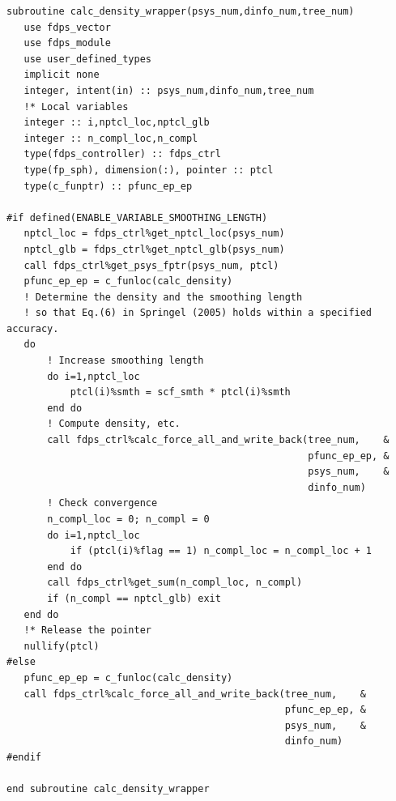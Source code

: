 \begin{lstlisting}[caption=Subroutine \texttt{calc\_density\_wrapper}]
subroutine calc_density_wrapper(psys_num,dinfo_num,tree_num)
   use fdps_vector
   use fdps_module
   use user_defined_types
   implicit none
   integer, intent(in) :: psys_num,dinfo_num,tree_num
   !* Local variables
   integer :: i,nptcl_loc,nptcl_glb
   integer :: n_compl_loc,n_compl
   type(fdps_controller) :: fdps_ctrl
   type(fp_sph), dimension(:), pointer :: ptcl
   type(c_funptr) :: pfunc_ep_ep

#if defined(ENABLE_VARIABLE_SMOOTHING_LENGTH)
   nptcl_loc = fdps_ctrl%get_nptcl_loc(psys_num)
   nptcl_glb = fdps_ctrl%get_nptcl_glb(psys_num)
   call fdps_ctrl%get_psys_fptr(psys_num, ptcl)
   pfunc_ep_ep = c_funloc(calc_density)
   ! Determine the density and the smoothing length
   ! so that Eq.(6) in Springel (2005) holds within a specified accuracy.
   do
       ! Increase smoothing length 
       do i=1,nptcl_loc
           ptcl(i)%smth = scf_smth * ptcl(i)%smth
       end do
       ! Compute density, etc.
       call fdps_ctrl%calc_force_all_and_write_back(tree_num,    &
                                                    pfunc_ep_ep, &
                                                    psys_num,    &
                                                    dinfo_num)
       ! Check convergence
       n_compl_loc = 0; n_compl = 0
       do i=1,nptcl_loc
           if (ptcl(i)%flag == 1) n_compl_loc = n_compl_loc + 1
       end do
       call fdps_ctrl%get_sum(n_compl_loc, n_compl)
       if (n_compl == nptcl_glb) exit
   end do
   !* Release the pointer
   nullify(ptcl)
#else
   pfunc_ep_ep = c_funloc(calc_density)
   call fdps_ctrl%calc_force_all_and_write_back(tree_num,    &
                                                pfunc_ep_ep, &
                                                psys_num,    &
                                                dinfo_num)
#endif

end subroutine calc_density_wrapper
\end{lstlisting}
\endifFtn
\ifC %
